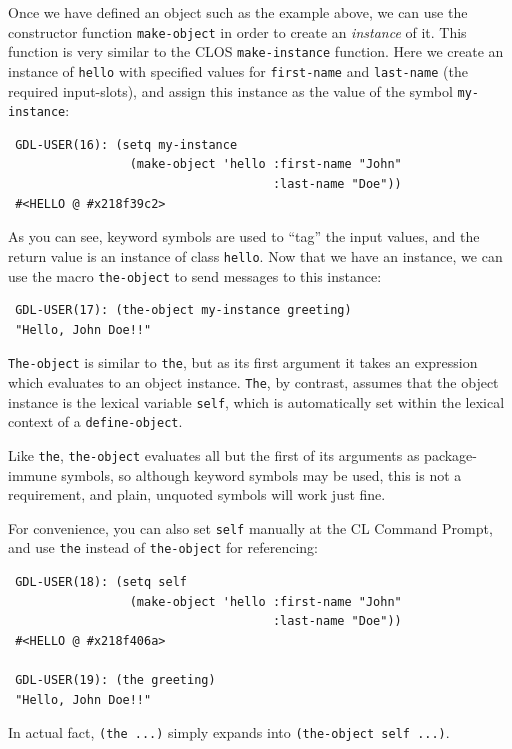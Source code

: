 \documentclass [11pt]{book}
\begin{document}
Once we have defined an object such as the example above, we can use
the constructor function \texttt{make-object} in order to create an \emph{instance} of it. This function is very similar to the CLOS \texttt{make-instance} function. Here we create an instance of \texttt{hello} with specified values for \texttt{first-name} and \texttt{last-name} (the required input-slots), and assign this instance as the value of the symbol \texttt{my-instance}:

\begin{verbatim}
 GDL-USER(16): (setq my-instance
                 (make-object 'hello :first-name "John" 
                                     :last-name "Doe"))
 #<HELLO @ #x218f39c2>
\end{verbatim}As you can see, keyword symbols are used to ``tag'' the input values, and the return value is an instance of class \texttt{hello}. Now that we have an instance, we can use the macro \texttt{the-object} to send messages to this instance:

\begin{verbatim}
 GDL-USER(17): (the-object my-instance greeting)
 "Hello, John Doe!!"
\end{verbatim}\texttt{The-object} is similar to \texttt{the}, but as its first argument it takes an expression which evaluates to an
object instance. \texttt{The}, by contrast, assumes that the object instance is the lexical variable \texttt{self}, which is automatically set within the lexical context of a \texttt{define-object}.

Like \texttt{the}, \texttt{the-object} evaluates all but the first of its arguments as package-immune symbols,
so although keyword symbols may be used, this is not a requirement, and plain,
unquoted symbols will work just fine.

For convenience, you can also set \texttt{self} manually at the CL Command Prompt, and use \texttt{the} instead of \texttt{the-object} for referencing:

\begin{verbatim}
 GDL-USER(18): (setq self 
                 (make-object 'hello :first-name "John" 
                                     :last-name "Doe"))
 #<HELLO @ #x218f406a>

 GDL-USER(19): (the greeting)
 "Hello, John Doe!!"
\end{verbatim}In actual fact, \texttt{(the ...)} simply expands into \texttt{(the-object self ...)}.
\end{document}
